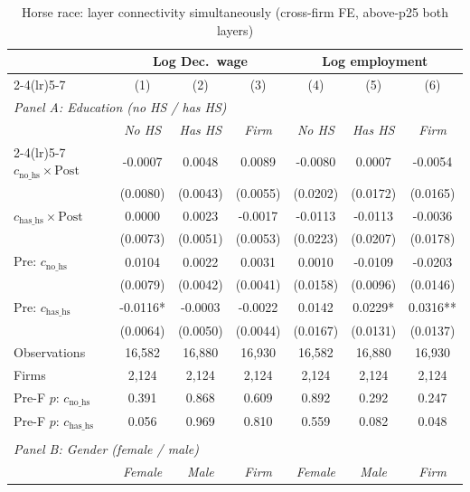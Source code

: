 \begin{table}[H]
\centering
\caption{Horse race: layer connectivity simultaneously (cross-firm FE, above-p25 both layers)}
\label{tab:horse_race_xfirm_abvp25_combined}
\scriptsize
\begin{threeparttable}
\begin{tabular}{lcccccc}
\toprule\toprule
 & \multicolumn{3}{c}{Log Dec.\ wage} & \multicolumn{3}{c}{Log employment} \\
\cmidrule(lr){2-4}\cmidrule(lr){5-7}
 & (1) & (2) & (3) & (4) & (5) & (6) \\
\midrule
\multicolumn{7}{l}{\textit{Panel A: Education (no HS / has HS)}} \\
\quad & \textit{No HS} & \textit{Has HS} & \textit{Firm} & \textit{No HS} & \textit{Has HS} & \textit{Firm} \\[-2pt]
\cmidrule(lr){2-4}\cmidrule(lr){5-7}
\quad $c_{\text{no\_hs}} \times \text{Post}$ & -0.0007 & 0.0048 & 0.0089 & -0.0080 & 0.0007 & -0.0054 \\
 & (0.0080) & (0.0043) & (0.0055) & (0.0202) & (0.0172) & (0.0165) \\
\quad $c_{\text{has\_hs}} \times \text{Post}$ & 0.0000 & 0.0023 & -0.0017 & -0.0113 & -0.0113 & -0.0036 \\
 & (0.0073) & (0.0051) & (0.0053) & (0.0223) & (0.0207) & (0.0178) \\
\quad Pre: $c_{\text{no\_hs}}$ & 0.0104 & 0.0022 & 0.0031 & 0.0010 & -0.0109 & -0.0203 \\
 & (0.0079) & (0.0042) & (0.0041) & (0.0158) & (0.0096) & (0.0146) \\
\quad Pre: $c_{\text{has\_hs}}$ & -0.0116* & -0.0003 & -0.0022 & 0.0142 & 0.0229* & 0.0316** \\
 & (0.0064) & (0.0050) & (0.0044) & (0.0167) & (0.0131) & (0.0137) \\
\quad Observations & 16,582 & 16,880 & 16,930 & 16,582 & 16,880 & 16,930 \\
\quad Firms & 2,124 & 2,124 & 2,124 & 2,124 & 2,124 & 2,124 \\
\quad Pre-F $p$: $c_{\text{no\_hs}}$ & 0.391 & 0.868 & 0.609 & 0.892 & 0.292 & 0.247 \\
\quad Pre-F $p$: $c_{\text{has\_hs}}$ & 0.056 & 0.969 & 0.810 & 0.559 & 0.082 & 0.048 \\
\\[-2pt]
\multicolumn{7}{l}{\textit{Panel B: Gender (female / male)}} \\
\quad & \textit{Female} & \textit{Male} & \textit{Firm} & \textit{Female} & \textit{Male} & \textit{Firm} \\[-2pt]

\end{tabular}
\end{threeparttable}
\end{table}
